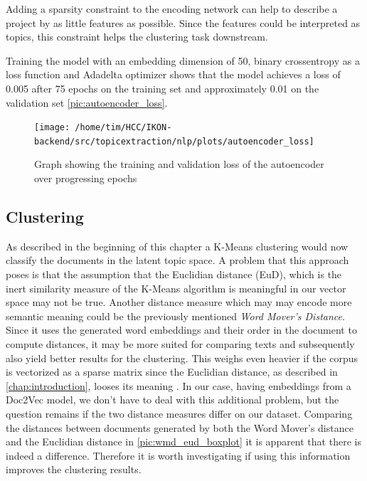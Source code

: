 Adding a sparsity constraint to the encoding network can help to describe a project by as little features as possible. Since the features could be interpreted as topics, this constraint helps the clustering task downstream.

Training the model with an embedding dimension of 50, binary crossentropy as a loss function and Adadelta optimizer shows that the model achieves a loss of 0.005 after 75 epochs on the training set and approximately 0.01 on the validation set \autoref{pic:autoencoder_loss}.

\begin{figure}[htbp!]
	\centering
	\texttt{[image: /home/tim/HCC/IKON-backend/src/topicextraction/nlp/plots/autoencoder\_loss]}
	\caption{\label{pic:autoencoder_loss} Graph showing the training and validation loss of the autoencoder over progressing epochs}
\end{figure}

 

\subsection{Clustering}

As described in the beginning of this chapter a K-Means clustering would now classify the documents in the latent topic space. A problem that this approach poses is that the assumption that the Euclidian distance (EuD), which is the inert similarity measure of the K-Means algorithm is meaningful in our vector space may not be true. Another distance measure which may may encode more semantic meaning could be the previously mentioned \textit{Word Mover's Distance}. Since it uses the generated word embeddings and their order in the document to compute distances, it may be more suited for comparing texts and subsequently also yield better results for the clustering. This weighs even heavier if the corpus is vectorized as a sparse matrix since the Euclidian distance, as described in \autoref{chap:introduction}, looses its meaning . In our case, having embeddings from a Doc2Vec model, we don't have to deal with this additional problem, but the question remains if the two distance measures differ on our dataset.  
Comparing the distances between documents generated by both the Word Mover's distance and the Euclidian distance in \autoref{pic:wmd_eud_boxplot} it is apparent that there is indeed a difference. Therefore it is worth investigating if using this information improves the clustering results. 

